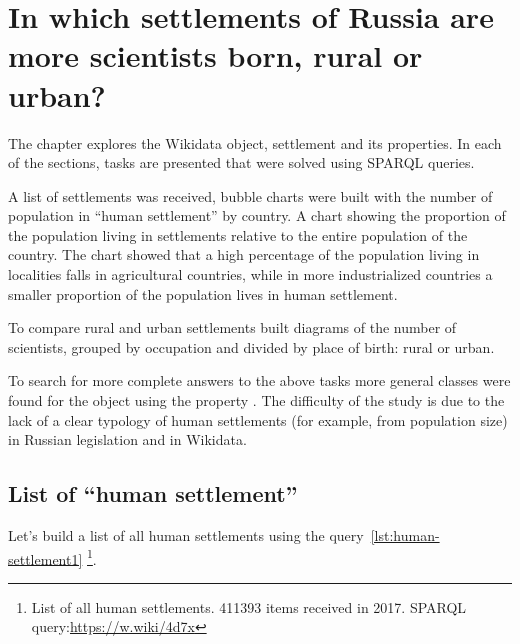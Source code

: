 \setchapterpreamble[u]{\margintoc}
\chapter[In which settlements of Russia are more scientists born, rural or urban?]{In which settlements of Russia are more scientists born, rural or urban?\protect\footnotemark}


The chapter explores the Wikidata object,  settlement and its properties. In each of the sections, 
tasks are presented that were solved using SPARQL queries.

A list of settlements was received,
bubble charts were built with the number of population in ``human settlement'' by country.
A chart showing the proportion of the population
living in settlements relative to the entire population of the country.
The chart showed that a high percentage of the population living in localities
falls in agricultural countries, while in more industrialized countries
a smaller proportion of the population lives in human settlement.

To compare rural and urban settlements
built diagrams of the number of scientists, grouped by occupation
and divided by place of birth: rural or urban.

To search for more complete answers to the above tasks
more general classes were found for the object 
using the property .
The difficulty of the study is due to the lack of a clear typology of human settlements
(for example, from population size) in Russian legislation and in Wikidata.

\section{List of ``human settlement''}

Let's build a list of all human settlements using the query~\ref{lst:human-settlement1} \footnote{List of all human settlements. \num{411393} items received in 2017. SPARQL query:\href{https://w.wiki/4d7x}{https://w.wiki/4d7x}}.

